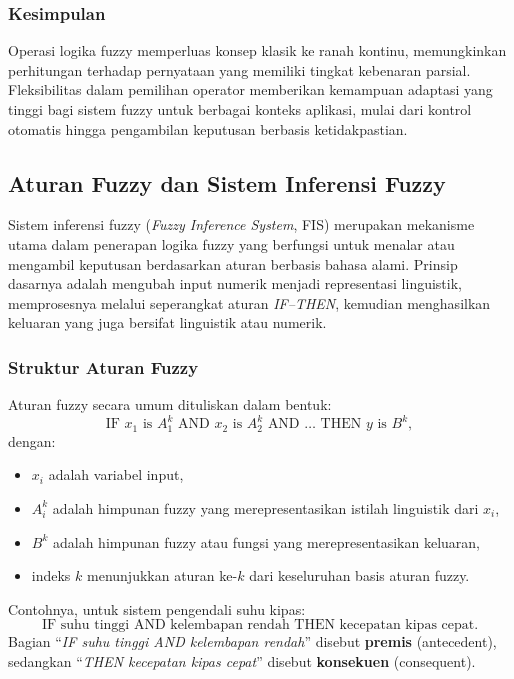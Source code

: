 \documentclass[12pt,a4paper]{article}
\theoremstyle{remark}
\begin{document}
\subsubsection{Kesimpulan}
Operasi logika fuzzy memperluas konsep klasik ke ranah kontinu, memungkinkan perhitungan terhadap pernyataan yang memiliki tingkat kebenaran parsial. Fleksibilitas dalam pemilihan operator memberikan kemampuan adaptasi yang tinggi bagi sistem fuzzy untuk berbagai konteks aplikasi, mulai dari kontrol otomatis hingga pengambilan keputusan berbasis ketidakpastian.

\subsection{Aturan Fuzzy dan Sistem Inferensi Fuzzy}

Sistem inferensi fuzzy (\textit{Fuzzy Inference System}, FIS) merupakan mekanisme utama dalam penerapan logika fuzzy yang berfungsi untuk menalar atau mengambil keputusan berdasarkan aturan berbasis bahasa alami. Prinsip dasarnya adalah mengubah input numerik menjadi representasi linguistik, memprosesnya melalui seperangkat aturan \textit{IF–THEN}, kemudian menghasilkan keluaran yang juga bersifat linguistik atau numerik.

\subsubsection{Struktur Aturan Fuzzy}

Aturan fuzzy secara umum dituliskan dalam bentuk:
\[
    \text{IF } x_1 \text{ is } A_1^k \text{ AND } x_2 \text{ is } A_2^k \text{ AND } \dots \text{ THEN } y \text{ is } B^k,
\]
dengan:
\begin{itemize}
    \item \(x_i\) adalah variabel input,
    \item \(A_i^k\) adalah himpunan fuzzy yang merepresentasikan istilah linguistik dari \(x_i\),
    \item \(B^k\) adalah himpunan fuzzy atau fungsi yang merepresentasikan keluaran,
    \item indeks \(k\) menunjukkan aturan ke-\(k\) dari keseluruhan basis aturan fuzzy.
\end{itemize}

Contohnya, untuk sistem pengendali suhu kipas:
\[
    \text{IF suhu tinggi AND kelembapan rendah THEN kecepatan kipas cepat.}
\]
Bagian “\textit{IF suhu tinggi AND kelembapan rendah}” disebut \textbf{premis} (antecedent), sedangkan “\textit{THEN kecepatan kipas cepat}” disebut \textbf{konsekuen} (consequent).
\end{document}
